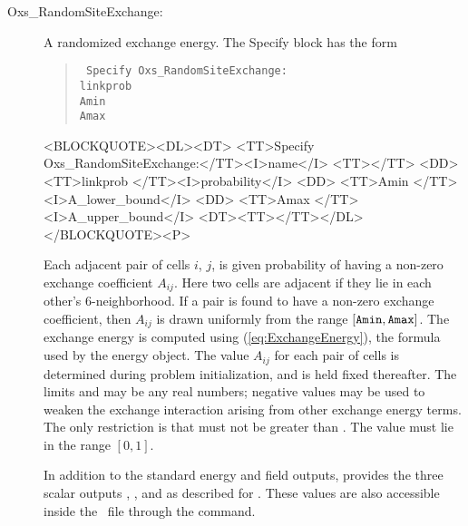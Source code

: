 \begin{description}
\item[Oxs\_RandomSiteExchange:]
%
   A randomized exchange energy.  The Specify block has the form
   \begin{latexonly}
      \begin{quote}\tt
      Specify Oxs\_RandomSiteExchange: \ocb\\
        \bi linkprob  \\
        \bi Amin  \\
        \bi Amax  \\
      \ccb
      \end{quote}
   \end{latexonly}
   \begin{rawhtml}
   <BLOCKQUOTE><DL><DT>
   <TT>Specify Oxs_RandomSiteExchange:</TT><I>name</I> <TT>{</TT>
       <DD> <TT>linkprob </TT><I>probability</I>
       <DD> <TT>Amin </TT><I>A_lower_bound</I>
       <DD> <TT>Amax </TT><I>A_upper_bound</I>
   <DT><TT>}</TT></DL></BLOCKQUOTE><P>
   \end{rawhtml}
   Each adjacent pair of cells $i$, $j$, is given 
   probability of having a non-zero exchange coefficient $A_{ij}$.  Here
   two cells are adjacent if they lie in each other's 6-neighborhood.
   If a pair is found to have a non-zero exchange coefficient, then
   $A_{ij}$ is drawn uniformly from the range $[\texttt{Amin},\texttt{Amax}]$.
   The exchange energy is computed using (\ref{eq:ExchangeEnergy}), the
   formula used by the  energy object.  The
   value $A_{ij}$ for each pair of cells is determined during problem
   initialization, and is held fixed thereafter.  The limits
    and  may be any real
   numbers; negative values may be used to weaken the exchange
   interaction arising from other exchange energy terms.  The only
   restriction is that  must not be greater than
   .  The  value 
   must lie in the range $[0,1]$.

   In addition to the standard energy and field outputs,
    provides the three scalar outputs
   , , and
    as described for .
   These values are also accessible inside the \MIF\ file through the
    command.


\end{description}
